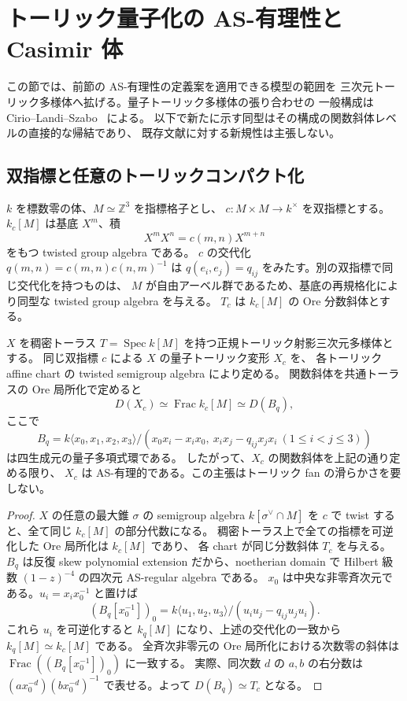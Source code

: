 \section{トーリック量子化の AS-有理性と Casimir 体}\label{sec:toric-as-rational}
この節では、前節の AS-有理性の定義案を適用できる模型の範囲を
三次元トーリック多様体へ拡げる。量子トーリック多様体の張り合わせの
一般構成は Cirio--Landi--Szabo~\cite{CLS} による。
以下で新たに示す同型はその構成の関数斜体レベルの直接的な帰結であり、
既存文献に対する新規性は主張しない。

\subsection{双指標と任意のトーリックコンパクト化}
$k$ を標数零の体、$M\simeq\mathbb Z^3$ を指標格子とし、
$c:M\times M\to k^\times$ を双指標とする。
$k_c[M]$ は基底 $X^m$、積
\[
 X^m X^n=c(m,n)X^{m+n}
\]
をもつ twisted group algebra である。
$c$ の交代化 $q(m,n)=c(m,n)c(n,m)^{-1}$ は
$q(e_i,e_j)=q_{ij}$ をみたす。別の双指標で同じ交代化を持つものは、
$M$ が自由アーベル群であるため、基底の再規格化により同型な twisted group algebra を与える。
$T_c$ は $k_c[M]$ の Ore 分数斜体とする。

\begin{theorem}\label{thm:toric-AS-rational}
$X$ を稠密トーラス $T=\operatorname{Spec}k[M]$ を持つ正規トーリック射影三次元多様体とする。
同じ双指標 $c$ による $X$ の量子トーリック変形 $X_c$ を、
各トーリック affine chart の twisted semigroup algebra により定める。
関数斜体を共通トーラスの Ore 局所化で定めると
\[
 D(X_c)\simeq \operatorname{Frac}k_c[M]\simeq D(B_q),
\]
ここで
\[
 B_q=k\langle x_0,x_1,x_2,x_3\rangle/
 (x_0x_i-x_ix_0,\ x_ix_j-q_{ij}x_jx_i\ (1\le i<j\le3))
\]
は四生成元の量子多項式環である。
したがって、$X_c$ の関数斜体を上記の通り定める限り、
$X_c$ は AS-有理的である。この主張はトーリック fan の滑らかさを要しない。
\end{theorem}
\begin{proof}
$X$ の任意の最大錐 $\sigma$ の semigroup algebra $k[\sigma^\vee\cap M]$ を
$c$ で twist すると、全て同じ $k_c[M]$ の部分代数になる。
稠密トーラス上で全ての指標を可逆化した Ore 局所化は $k_c[M]$ であり、
各 chart が同じ分数斜体 $T_c$ を与える。
$B_q$ は反復 skew polynomial extension だから、noetherian domain で
Hilbert 級数 $(1-z)^{-4}$ の四次元 AS-regular algebra である。
$x_0$ は中央な非零斉次元である。$u_i=x_ix_0^{-1}$ と置けば
\[
 (B_q[x_0^{-1}])_0
 =k\langle u_1,u_2,u_3\rangle/(u_i u_j-q_{ij}u_j u_i).
\]
これら $u_i$ を可逆化すると $k_q[M]$ になり、上述の交代化の一致から
$k_q[M]\simeq k_c[M]$ である。
全斉次非零元の Ore 局所化における次数零の斜体は
$\operatorname{Frac}((B_q[x_0^{-1}])_0)$ に一致する。
実際、同次数 $d$ の $a,b$ の右分数は
$(ax_0^{-d})(bx_0^{-d})^{-1}$ で表せる。よって $D(B_q)\simeq T_c$ となる。
\end{proof}


